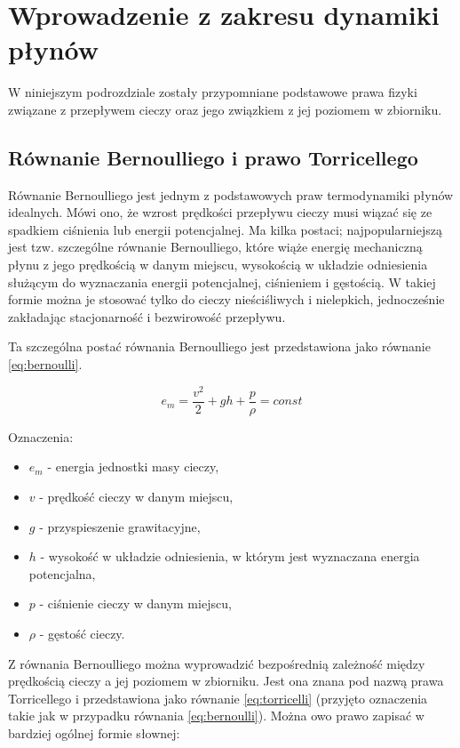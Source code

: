 \section{Wprowadzenie z zakresu dynamiki płynów}
\label{sec:plyny}

W niniejszym podrozdziale zostały przypomniane podstawowe prawa fizyki związane z przepływem cieczy oraz jego związkiem z jej poziomem w zbiorniku.

\subsection{Równanie Bernoulliego i prawo Torricellego}
\label{sub:plyny-torr}

Równanie Bernoulliego jest jednym z podstawowych praw termodynamiki płynów idealnych. Mówi ono, że wzrost prędkości przepływu cieczy musi wiązać się ze spadkiem ciśnienia lub energii potencjalnej.
Ma kilka postaci; najpopularniejszą jest tzw. szczególne równanie Bernoulliego, które wiąże energię mechaniczną płynu z jego prędkością w danym miejscu, wysokością w układzie odniesienia służącym do wyznaczania energii potencjalnej, ciśnieniem i gęstością.
W takiej formie można je stosować tylko do cieczy nieściśliwych i nielepkich, jednocześnie zakładając stacjonarność i bezwirowość przepływu.

Ta szczególna postać równania Bernoulliego jest przedstawiona jako równanie \ref{eq:bernoulli}.

\begin{equation}\label{eq:bernoulli}
e_{m} = \frac{v^2}{2} + gh + \frac{p}{\rho} = const
\end{equation}

Oznaczenia:
\begin{itemize}
	\item $e_{m}$ - energia jednostki masy cieczy,
	\item $v$ - prędkość cieczy w danym miejscu,
	\item $g$ - przyspieszenie grawitacyjne,
	\item $h$ - wysokość w układzie odniesienia, w którym jest wyznaczana energia potencjalna,
	\item $p$ - ciśnienie cieczy w danym miejscu,
	\item $\rho$ - gęstość cieczy.
\end{itemize}

Z równania Bernoulliego można wyprowadzić bezpośrednią zależność między prędkością cieczy a jej poziomem w zbiorniku. Jest ona znana pod nazwą prawa Torricellego i przedstawiona jako równanie \ref{eq:torricelli} (przyjęto oznaczenia takie jak w przypadku równania \ref{eq:bernoulli}).
Można owo prawo zapisać w bardziej ogólnej formie słownej:

